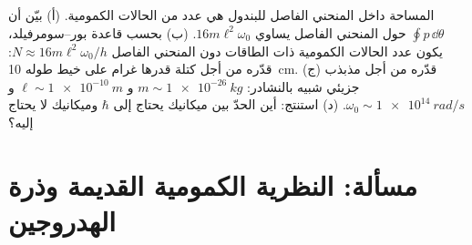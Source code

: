 \begin{exercise}[$\star\star\star$]\label{exo:b3:hamiltonian-mechanics:12}
المساحة داخل المنحني الفاصل للبندول هي عدد من الحالات الكمومية.
(أ) بيّن أن $\oint p\,\dd\theta$ حول المنحني الفاصل يساوي
$16m\ell^2\omega_0$. (ب) بحسب قاعدة بور--سومرفيلد، يكون عدد
الحالات الكمومية ذات الطاقات دون المنحني الفاصل $N \approx
16m\ell^2\omega_0/h$: قدّره من أجل كتلة قدرها غرام على خيط طوله
\qty{10}{cm}. (ج) قدّره من أجل مذبذب جزيئي شبيه بالنشادر:
$m \sim \qty{1e-26}{kg}$ و $\ell \sim \qty{1e-10}{m}$ و
$\omega_0 \sim \qty{1e14}{rad/s}$. (د) استنتج: أين الحدّ بين
ميكانيك يحتاج إلى $\hbar$ وميكانيك لا يحتاج إليه؟
\end{exercise}

\section{مسألة: النظرية الكمومية القديمة وذرة الهدروجين}

